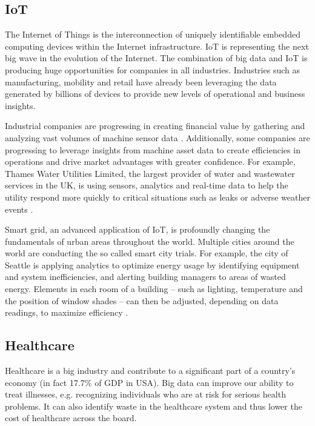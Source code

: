 \documentclass[12pt]{book}
\begin{document}
\subsection{IoT}
The Internet of Things is the interconnection of uniquely identifiable embedded computing devices within the Internet infrastructure. IoT is representing the next big wave in the evolution of the Internet. The combination of big data and IoT is producing huge opportunities for companies in all industries. Industries such as manufacturing, mobility and retail have already been leveraging the data generated by billions of devices to provide new levels of operational and business insights. 

Industrial companies are progressing in creating financial value by gathering and analyzing vast volumes of machine sensor data \cite{IndustrialInternetReport2014}. Additionally, some companies are progressing to leverage insights from machine asset data to create efficiencies in operations and drive market advantages with greater confidence. For example, Thames Water Utilities Limited, the largest provider of water and wastewater services in the UK, is using sensors, analytics and real-time data to help the utility respond more quickly to critical situations such as leaks or adverse weather events \cite{Accenture14SmartGrid}.

Smart grid, an advanced application of IoT, is profoundly changing the fundamentals of urban areas throughout the world. Multiple cities around the world are conducting the so called smart city trials. For example, the city of Seattle is applying analytics to optimize energy usage by identifying equipment and system inefficiencies, and alerting building managers to areas of wasted energy. Elements in each room of a building -- such as lighting, temperature and the position of window shades -- can then be adjusted, depending on data readings, to maximize efficiency \cite{Accenture13Seattle}.

\subsection{Healthcare}
Healthcare is a big industry and contribute to a significant part of a country's economy (in fact 17.7\% of GDP in USA). Big data can improve our ability to treat illnesses, e.g. recognizing individuals who are at risk for serious health problems. It can also identify waste in the healthcare system and thus lower the cost of healthcare across the board.
\end{document}
